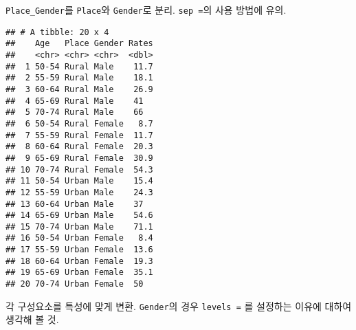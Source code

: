 \documentclass[
]{article}
\newenvironment{Shaded}{\begin{snugshade}}{\end{snugshade}}
\newcommand{\DataTypeTok}[1]{\textcolor[rgb]{0.13,0.29,0.53}{#1}}
\newcommand{\KeywordTok}[1]{\textcolor[rgb]{0.13,0.29,0.53}{\textbf{#1}}}
\newcommand{\NormalTok}[1]{#1}
\newcommand{\OperatorTok}[1]{\textcolor[rgb]{0.81,0.36,0.00}{\textbf{#1}}}
\newcommand{\StringTok}[1]{\textcolor[rgb]{0.31,0.60,0.02}{#1}}
\begin{document}
\texttt{Place\_Gender}를 \texttt{Place}와 \texttt{Gender}로 분리.
\texttt{sep\ =}의 사용 방법에 유의.

\begin{Shaded}
\end{Shaded}

\begin{verbatim}
## # A tibble: 20 x 4
##    Age   Place Gender Rates
##    <chr> <chr> <chr>  <dbl>
##  1 50-54 Rural Male    11.7
##  2 55-59 Rural Male    18.1
##  3 60-64 Rural Male    26.9
##  4 65-69 Rural Male    41  
##  5 70-74 Rural Male    66  
##  6 50-54 Rural Female   8.7
##  7 55-59 Rural Female  11.7
##  8 60-64 Rural Female  20.3
##  9 65-69 Rural Female  30.9
## 10 70-74 Rural Female  54.3
## 11 50-54 Urban Male    15.4
## 12 55-59 Urban Male    24.3
## 13 60-64 Urban Male    37  
## 14 65-69 Urban Male    54.6
## 15 70-74 Urban Male    71.1
## 16 50-54 Urban Female   8.4
## 17 55-59 Urban Female  13.6
## 18 60-64 Urban Female  19.3
## 19 65-69 Urban Female  35.1
## 20 70-74 Urban Female  50
\end{verbatim}

각 구성요소를 특성에 맞게 변환. \texttt{Gender}의 경우
\texttt{levels\ =} 를 설정하는 이유에 대하여 생각해 볼 것.
\end{document}
